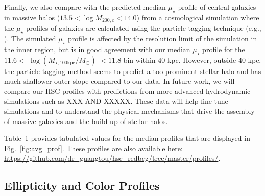 \documentclass[a4paper,fleqn,usenatbib]{mnras}
\def\logmtot{{$\log (M_{\star,100\mathrm{kpc}}/M_{\odot})$}}
\def\mden{{$\mu_{\star}$}}
\begin{document}
    Finally, we also compare with the predicted median \mden{} profile of central 
    galaxies in massive halos ($13.5 < \log M_{200,c} < 14.0$) from a cosmological 
    simulation where the \mden{} profiles of galaxies are calculated using the 
    particle-tagging technique (e.g., \citealt{Cooper2010}). 
    The simulated \mden{} profile is affected by the resolution limit of the simulation in the inner region, but  is in good agreement with our median \mden{} profile for 
    the $11.6 <$ \logmtot{} $< 11.8$ bin within 40 kpc. 
    However, outside 40 kpc, the particle tagging method seems to predict a too 
    prominent stellar halo and has much shallower outer slope compared to our data. In future work, we will compare  our HSC profiles with  predictions from more advanced 
    hydrodynamic simulations such as XXX AND XXXXX. These data will help fine-tune simulations and to understand the physical mechanisms that drive the assembly of massive galaxies and the 
    build up of stellar halos.

    Table~1 provides tabulated values for the median profiles that are 
    displayed in Fig.~\ref{fig:avg_prof}. 
    These profiles are also available  
    \href{https://github.com/dr-guangtou/hsc_redbcg/tree/master/profiles}{here}:
    {\url{https://github.com/dr_guangtou/hsc_redbcg/tree/master/profiles/}}.
    

\subsection{Ellipticity and Color Profiles}
    \label{ssec:ell_color}
    
\end{document}
